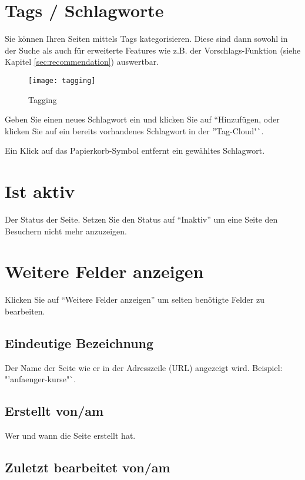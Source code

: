 \documentclass[article, a4paper, oneside, 11pt]{memoir}
\begin{document}
\section{Tags / Schlagworte}
\label{sec:tagging}

Sie können Ihren Seiten mittels Tags kategorisieren. Diese sind dann sowohl in der Suche als auch für erweiterte Features wie z.B. der Vorschlags-Funktion (siehe Kapitel \vref{sec:recommendation}) auswertbar.

\begin{figure}[htp]
\centering
\texttt{[image: tagging]}
\caption{Tagging}
\label{fig:tagging}
\end{figure}

Geben Sie einen neues Schlagwort ein und klicken Sie auf "`Hinzufügen, oder klicken Sie auf ein bereits vorhandenes Schlagwort in der "'Tag-Cloud"`.

Ein Klick auf das Papierkorb-Symbol entfernt ein gewähltes Schlagwort.

\section{Ist aktiv}

Der Status der Seite. Setzen Sie den Status auf "`Inaktiv"' um eine Seite den Besuchern nicht mehr anzuzeigen.




\section{Weitere Felder anzeigen}

Klicken Sie auf "`Weitere Felder anzeigen"' um selten benötigte Felder zu bearbeiten.

\subsection{Eindeutige Bezeichnung}

Der Name der Seite wie er in der Adresszeile (URL) angezeigt wird. Beispiel: "'anfaenger-kurse"`.

\subsection{Erstellt von/am}

Wer und wann die Seite erstellt hat.

\subsection{Zuletzt bearbeitet von/am}
\end{document}

